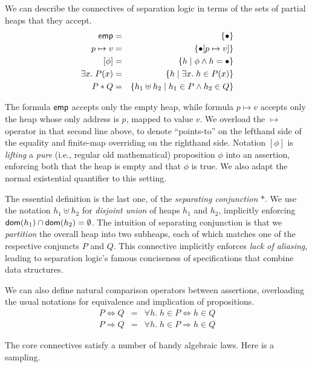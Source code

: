 \documentclass{amsbook}
\theoremstyle{definition}
\theoremstyle{remark}
\numberwithin{section}{chapter}
\numberwithin{equation}{chapter}
\begin{document}
\newcommand{\emp}[0]{\mt{emp}}
\newcommand{\lift}[1]{[#1]}
\newcommand{\ptsto}[2]{#1 \mapsto #2}

We can describe the connectives of separation logic in terms of the sets of partial heaps that they accept.
\begin{eqnarray*}
  \emp &=& \{\mempty\} \\
  \ptsto{p}{v} &=& \{\mupd{\mempty}{p}{v}\} \\
  \lift{\phi} &=& \{h \mid \phi \land h = \mempty\} \\
  \exists x. \; P(x) &=& \{h \mid \exists x. \; h \in P(x)\} \\
  P * Q &=& \{h_1 \uplus h_2 \mid h_1 \in P \land h_2 \in Q\}
\end{eqnarray*}

The formula $\emp$ accepts only the empty heap, while formula $\ptsto{p}{v}$ accepts only the heap whose only address is $p$, mapped to value $v$.
We overload the $\mapsto$ operator in that second line above, to denote ``points-to'' on the lefthand side of the equality and finite-map overriding on the righthand side.
Notation $\lift{\phi}$ is \emph{lifting} a \emph{pure} (i.e., regular old mathematical) proposition $\phi$ into an assertion, enforcing both that the heap is empty and that $\phi$ is true.
We also adapt the normal existential quantifier to this setting.

The essential definition is the last one, of the \emph{separating conjunction} $*$.
We use the notation $h_1 \uplus h_2$ for \emph{disjoint union} of heaps $h_1$ and $h_2$, implicitly enforcing $\mathsf{dom}(h_1) \cap \mathsf{dom}(h_2) = \emptyset$.
The intuition of separating conjunction is that we \emph{partition} the overall heap into two subheaps, each of which matches one of the respective conjuncts $P$ and $Q$.
This connective implicitly enforces \emph{lack of aliasing}, leading to separation logic's famous conciseness of specifications that combine data structures.

We can also define natural comparison operators between assertions, overloading the usual notations for equivalence and implication of propositions.
\begin{eqnarray*}
  P \Leftrightarrow Q &=& \forall h. \; h \in P \Leftrightarrow h \in Q \\
  P \Rightarrow Q &=& \forall h. \; h \in P \Rightarrow h \in Q
\end{eqnarray*}

The core connectives satisfy a number of handy algebraic laws.
Here is a sampling.
\end{document}
